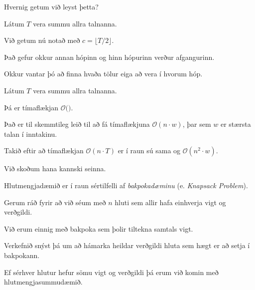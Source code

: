 {
    {
        \item<1-> Hvernig getum við leyst þetta?
            \item<2-> Látum $T$ vera summu allra talnanna.
            \item<3-> Við getum nú notað  með $c = \lfloor T/2 \rfloor$.
            \item<4-> Það gefur okkur annan hópinn og hinn hópurinn verður afgangurinn.
            \item<5-> Okkur vantar þó að finna hvaða tölur eiga að vera í hvorum hóp.
    }
}

{
}

{
    {
        \item<1-> Látum $T$ vera summu allra talnanna.
            \item<2-> Þá er tímaflækjan $\mathcal{O}($$)$.
            \item<4-> Það er til skemmtileg leið til að fá tímaflækjuna $\mathcal{O}(n \cdot w)$, þar sem $w$ er stærsta talan í inntakinu.
            \item<5-> Takið eftir að tímaflækjan $\mathcal{O}(n \cdot T)$ er í raun sú sama og $\mathcal{O}(n^2 \cdot w)$.
            \item<6-> Við skoðum hana kannski seinna.
    }
}

{
    {
        \item<1-> Hlutmengjadæmið er í raun sértilfelli af \emph{bakpokadæminu} (e. \emph{Knapsack Problem}).
            \item<2-> Gerum ráð fyrir að við séum með $n$ hluti sem allir hafa einhverja vigt og verðgildi.
            \item<3-> Við erum einnig með bakpoka sem þolir tiltekna samtals vigt.
            \item<4-> Verkefnið snýst þá um að hámarka heildar verðgildi hluta sem hægt er að setja í bakpokann.
            \item<5-> Ef sérhver hlutur hefur sömu vigt og verðgildi þá erum við komin með hlutmengjasummudæmið.
    }
}

